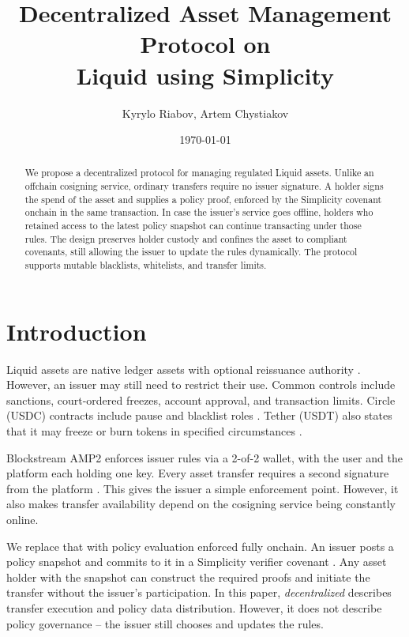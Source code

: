 \documentclass[11pt]{article}
\title{Decentralized Asset Management Protocol on \\
Liquid using Simplicity}
\author{Kyrylo Riabov, Artem Chystiakov}
\affil{Blockstream}
\date{\today}
\begin{document}
    \maketitle

    \begin{abstract}
        We propose a decentralized protocol for managing regulated Liquid assets.
        Unlike an offchain cosigning service, ordinary transfers require no issuer signature.
        A holder signs the spend of the asset and supplies a policy proof, enforced by the Simplicity covenant onchain in the same transaction.
        In case the issuer's service goes offline, holders who retained access to the latest policy snapshot can continue transacting under those rules.
        The design preserves holder custody and confines the asset to compliant covenants, still allowing the issuer to update the rules dynamically.
        The protocol supports mutable blacklists, whitelists, and transfer limits.
    \end{abstract}


    \section{Introduction}

    Liquid assets are native ledger assets with optional reissuance authority \cite{liquid,liquid-assets}.
    However, an issuer may still need to restrict their use.
    Common controls include sanctions, court-ordered freezes, account approval, and transaction limits.
    Circle (USDC) contracts include pause and blacklist roles \cite{usdc-contracts}.
    Tether (USDT) also states that it may freeze or burn tokens in specified circumstances \cite{tether-rid}.

    Blockstream AMP2 enforces issuer rules via a 2-of-2 wallet, with the user and the platform each holding one key.
    Every asset transfer requires a second signature from the platform \cite{liquid-assets}.
    This gives the issuer a simple enforcement point.
    However, it also makes transfer availability depend on the cosigning service being constantly online.

    We replace that with policy evaluation enforced fully onchain.
    An issuer posts a policy snapshot and commits to it in a Simplicity verifier covenant \cite{simplicity}.
    Any asset holder with the snapshot can construct the required proofs and initiate the transfer without the issuer's participation.
    In this paper, \emph{decentralized} describes transfer execution and policy data distribution.
    However, it does not describe policy governance -- the issuer still chooses and updates the rules.
\end{document}
